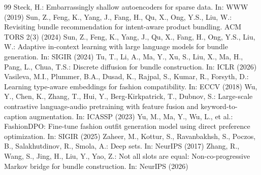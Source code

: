 \documentclass[runningheads]{llncs}
\begin{document}
\begin{thebibliography}{99}
 Steck, H.: Embarrassingly shallow autoencoders for sparse data. In: WWW (2019)
 Sun, Z., Feng, K., Yang, J., Fang, H., Qu, X., Ong, Y.S., Liu, W.: Revisiting bundle recommendation for intent-aware product bundling. ACM TORS 2(3) (2024)
 Sun, Z., Feng, K., Yang, J., Qu, X., Fang, H., Ong, Y.S., Liu, W.: Adaptive in-context learning with large language models for bundle generation. In: SIGIR (2024)
 Tu, T., Li, A., Ma, Y., Xu, S., Liu, X., Ma, H., Pang, L., Chua, T.S.: Discrete diffusion for bundle construction. In: ICLR (2026)
 Vasileva, M.I., Plummer, B.A., Dusad, K., Rajpal, S., Kumar, R., Forsyth, D.: Learning type-aware embeddings for fashion compatibility. In: ECCV (2018)
 Wu, Y., Chen, K., Zhang, T., Hui, Y., Berg-Kirkpatrick, T., Dubnov, S.: Large-scale contrastive language-audio pretraining with feature fusion and keyword-to-caption augmentation. In: ICASSP (2023)
 Yu, M., Ma, Y., Wu, L., et al.: FashionDPO: Fine-tune fashion outfit generation model using direct preference optimization. In: SIGIR (2025)
 Zaheer, M., Kottur, S., Ravanbakhsh, S., Poczos, B., Salakhutdinov, R., Smola, A.: Deep sets. In: NeurIPS (2017)
 Zhang, R., Wang, S., Jing, H., Liu, Y., Yao, Z.: Not all slots are equal: Non-co-progressive Markov bridge for bundle construction. In: NeurIPS (2026)
\end{thebibliography}
\end{document}
